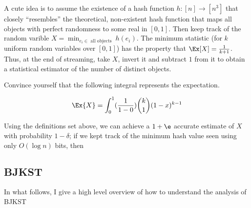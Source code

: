 \documentclass[../main.tex]{subfiles}
\begin{document}
\begin{remark}
    A cute idea is to assume the existence of a hash function $h: [n] \rightarrow [n^3]$ that closely ``resembles'' the theoretical, non-existent hash function that maps all objects with perfect randomness to some real in $[0,1]$. Then keep track of the random varible $X = \min_{e_{i} \in \text{ all objects }} h(e_{i})$. The minimum statistic (for $k$ uniform random variables over $[0,1]$) has the property that $\Ex[X] = \frac{1}{k+1}$. Thus, at the end of streaming, take $X$, invert it and subtract $1$ from it to obtain a statistical estimator of the number of distinct objects.

    Convince yourself that the following integral represents the expectation.

    \[
        \Ex{X} = \int_{0}^{1}(\frac{1}{1-0})\binom{k}{1} (1 - x)^{k-1}
    \]

\end{remark}


\begin{theorem}
    Using the definitions set above, we can achieve a $1 + \e$ accurate estimate
    of $X$ with probability $1 - \delta$; if we kept track of the minimum hash
    value seen using only $O(\log n)$ bits, then
\end{theorem}

\subsection{BJKST}

In what follows, I give a high level overview of how to understand the analysis of BJKST
\end{document}
